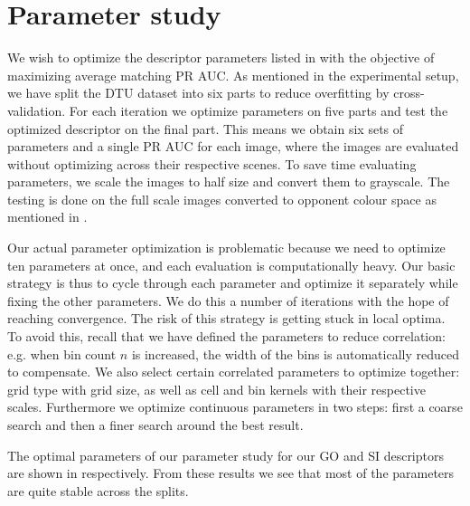 \documentclass[thesis.tex]{subfiles}
\begin{document}
\section{Parameter study}
\label{sec:icParameterStudy}
%
%
%
%
We wish to optimize the descriptor parameters listed in  with the objective of maximizing average matching PR AUC. As mentioned in the experimental setup, we have split the DTU dataset into six parts to reduce overfitting by cross-validation. For each iteration we optimize parameters on five parts and test the optimized descriptor on the final part. This means we obtain six sets of parameters and a single PR AUC for each image, where the images are evaluated without optimizing across their respective scenes. To save time evaluating parameters, we scale the images to half size and convert them to grayscale. The testing is done on the full scale images converted to opponent colour space as mentioned in .

Our actual parameter optimization is problematic because we need to optimize ten parameters at once, and each evaluation is computationally heavy. Our basic strategy is thus to cycle through each parameter and optimize it separately while fixing the other parameters. We do this a number of iterations with the hope of reaching convergence.
The risk of this strategy is getting stuck in local optima. To avoid this, recall that we have defined the parameters to reduce correlation: e.g. when bin count $n$ is increased, the width of the bins is automatically reduced to compensate. We also select certain correlated parameters to optimize together: grid type with grid size, as well as cell and bin kernels with their respective scales. Furthermore we optimize continuous parameters in two steps: first a coarse search and then a finer search around the best result.

The optimal parameters of our parameter study for our GO and SI descriptors are shown in  respectively.
From these results we see that most of the parameters are quite stable across the splits.
\end{document}
